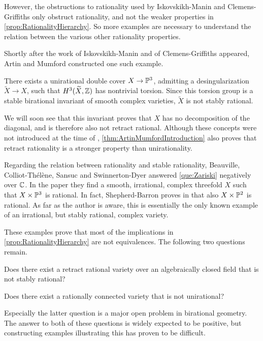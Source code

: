 However, the obstructions to rationality used by
Iskovskikh-Manin and Clemens-Griffiths
only obstruct rationality, and not the weaker properties in \cref{prop:RationalityHierarchy}. So more examples are necessary to understand the relation between the various other rationality properties.

Shortly after the work of Iskovskikh-Manin and of Clemens-Griffiths appeared, Artin and Mumford constructed one such example.
\begin{theorem}
	\label{thm:ArtinMumfordIntroduction}
	There exists a unirational double cover $X \to \P^3$, admitting a desingularization $\widetilde{X} \to X$, such that $H^3(\widetilde{X},\Z)$ has nontrivial torsion. Since this torsion group is a stable birational invariant of smooth complex varieties, $\widetilde{X}$ is not stably rational.
\end{theorem}
We will soon see that this invariant proves that $X$ has no decomposition of the diagonal, and is therefore also not retract rational. Although these concepts were not introduced at the time of \cite{ArtinMumford}, \cref{thm:ArtinMumfordIntroduction} also proves that retract rationality is a stronger property than unirationality.

Regarding the relation between rationality and stable rationality, Beauville, Colliot-Thélène, Sansuc and Swinnerton-Dyer answered \cref{que:Zariski} negatively over $\C$. In the paper \cite{BCTSSD} they find a smooth, irrational, complex threefold $X$ such that $X \times \P^3$ is rational. In fact, Shepherd-Barron proves in \cite{Shepherd-Barron} that also $X \times \P^2$ is rational. As far as the author is aware, this is essentially the only known example of an irrational, but stably rational, complex variety.

These examples prove that most of the implications in \cref{prop:RationalityHierarchy} are not equivalences. The following two questions remain.
\begin{question}
	\label{que:StableVsRetract}
	Does there exist a retract rational variety over an algebraically closed field that is not stably rational?
\end{question}

\begin{question}
	\label{que:RationallyConnectedVsUnirational}
	Does there exist a rationally connected variety that is not unirational?
\end{question}
Especially the latter question is a major open problem in birational geometry. The answer to both of these questions is widely expected to be positive, but constructing examples illustrating this has proven to be difficult.

